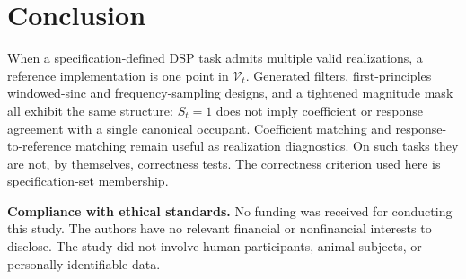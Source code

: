 \documentclass{article}
\begin{document}
\section{Conclusion}
\label{sec:conc}

When a specification-defined DSP task admits multiple valid
realizations, a reference implementation is one point in
$\mathcal{V}_t$.
Generated filters, first-principles windowed-sinc and
frequency-sampling designs, and a tightened magnitude mask all exhibit
the same structure: $S_t=1$ does not imply coefficient or
response agreement with a single canonical occupant.
Coefficient matching and response-to-reference matching remain useful
as realization diagnostics.
On such tasks they are not, by themselves, correctness tests.
The correctness criterion used here is specification-set membership.

\vspace{4pt}
\noindent\textbf{Compliance with ethical standards.}
No funding was received for conducting this study.
The authors have no relevant financial or nonfinancial interests
to disclose.
The study did not involve human participants, animal subjects, or
personally identifiable data.

\clearpage


\end{document}
